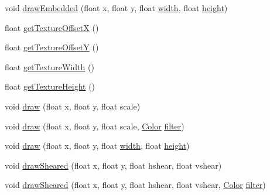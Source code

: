 \begin{DoxyCompactItemize}
\item 
void \mbox{\hyperlink{classorg_1_1newdawn_1_1slick_1_1_image_a5a8910fb31d9350d0c70fe7717172034}{draw\+Embedded}} (float x, float y, float \mbox{\hyperlink{classorg_1_1newdawn_1_1slick_1_1_image_a7d02c85e21b388428cfe5cc5c82714a1}{width}}, float \mbox{\hyperlink{classorg_1_1newdawn_1_1slick_1_1_image_a54397a37823bc59ddc79ec70dc5cf226}{height}})
\item 
float \mbox{\hyperlink{classorg_1_1newdawn_1_1slick_1_1_image_a1d7789c307a9d99268d4888e91124b59}{get\+Texture\+OffsetX}} ()
\item 
float \mbox{\hyperlink{classorg_1_1newdawn_1_1slick_1_1_image_a5fd5e077fd5bec9ee51afd995110fa37}{get\+Texture\+OffsetY}} ()
\item 
float \mbox{\hyperlink{classorg_1_1newdawn_1_1slick_1_1_image_a29fd0a5da72ff96d12bda50d9394f96c}{get\+Texture\+Width}} ()
\item 
float \mbox{\hyperlink{classorg_1_1newdawn_1_1slick_1_1_image_affb1fb7e0c29174983204c39cfb1af30}{get\+Texture\+Height}} ()
\item 
void \mbox{\hyperlink{classorg_1_1newdawn_1_1slick_1_1_image_af9cb38b72eecd528e2f1c679ef373871}{draw}} (float x, float y, float scale)
\item 
void \mbox{\hyperlink{classorg_1_1newdawn_1_1slick_1_1_image_ab9d8b095d00a8eda878037db5bf9b715}{draw}} (float x, float y, float scale, \mbox{\hyperlink{classorg_1_1newdawn_1_1slick_1_1_color}{Color}} \mbox{\hyperlink{classorg_1_1newdawn_1_1slick_1_1_image_a1c6f09687817420f3762f32bb1c3ed76}{filter}})
\item 
void \mbox{\hyperlink{classorg_1_1newdawn_1_1slick_1_1_image_a637e8d14b7705e8c6ca0b95c2aa92b93}{draw}} (float x, float y, float \mbox{\hyperlink{classorg_1_1newdawn_1_1slick_1_1_image_a7d02c85e21b388428cfe5cc5c82714a1}{width}}, float \mbox{\hyperlink{classorg_1_1newdawn_1_1slick_1_1_image_a54397a37823bc59ddc79ec70dc5cf226}{height}})
\item 
void \mbox{\hyperlink{classorg_1_1newdawn_1_1slick_1_1_image_ad1a02d31db5b4428fdd1f76669104669}{draw\+Sheared}} (float x, float y, float hshear, float vshear)
\item 
void \mbox{\hyperlink{classorg_1_1newdawn_1_1slick_1_1_image_a5bde154946459921a62faa1aef10a970}{draw\+Sheared}} (float x, float y, float hshear, float vshear, \mbox{\hyperlink{classorg_1_1newdawn_1_1slick_1_1_color}{Color}} \mbox{\hyperlink{classorg_1_1newdawn_1_1slick_1_1_image_a1c6f09687817420f3762f32bb1c3ed76}{filter}})
\item 

\end{DoxyCompactItemize}
